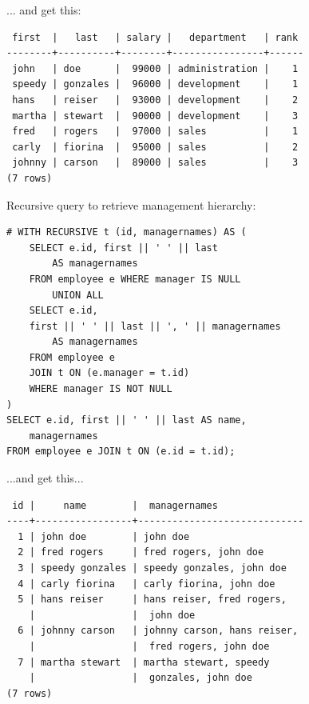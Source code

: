 \documentclass[svgnames]{beamer}
\begin{document}
\begin{frame}[fragile]
    ... and get this:
    \footnotesize
    \begin{verbatim}
 first  |   last   | salary |   department   | rank
--------+----------+--------+----------------+------
 john   | doe      |  99000 | administration |    1
 speedy | gonzales |  96000 | development    |    1
 hans   | reiser   |  93000 | development    |    2
 martha | stewart  |  90000 | development    |    3
 fred   | rogers   |  97000 | sales          |    1
 carly  | fiorina  |  95000 | sales          |    2
 johnny | carson   |  89000 | sales          |    3
(7 rows)
    \end{verbatim}
    \normalsize
\end{frame}

\begin{frame}[fragile]
    Recursive query to retrieve management hierarchy:
    \begin{verbatim}
# WITH RECURSIVE t (id, managernames) AS (
    SELECT e.id, first || ' ' || last
        AS managernames
    FROM employee e WHERE manager IS NULL
        UNION ALL
    SELECT e.id,
    first || ' ' || last || ', ' || managernames
        AS managernames
    FROM employee e
    JOIN t ON (e.manager = t.id)
    WHERE manager IS NOT NULL
)
SELECT e.id, first || ' ' || last AS name,
    managernames
FROM employee e JOIN t ON (e.id = t.id);
    \end{verbatim}
\end{frame}

\begin{frame}[fragile]
    ...and get this...
    \begin{verbatim}
 id |     name        |  managernames                   
----+-----------------+-----------------------------
  1 | john doe        | john doe
  2 | fred rogers     | fred rogers, john doe
  3 | speedy gonzales | speedy gonzales, john doe
  4 | carly fiorina   | carly fiorina, john doe
  5 | hans reiser     | hans reiser, fred rogers,
    |                 |  john doe
  6 | johnny carson   | johnny carson, hans reiser,
    |                 |  fred rogers, john doe
  7 | martha stewart  | martha stewart, speedy
    |                 |  gonzales, john doe
(7 rows)
    \end{verbatim}
\end{frame}
\end{document}
